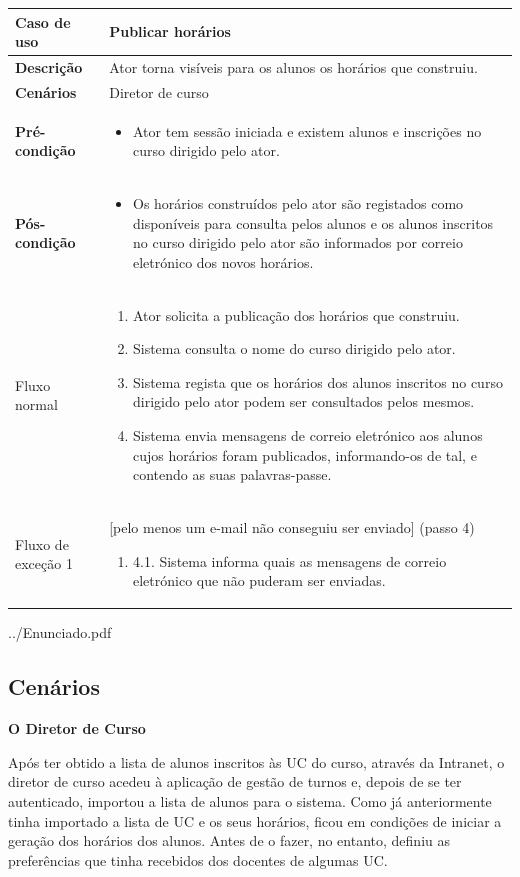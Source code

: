 \documentclass[12pt, a4paper]{article}
\makeatletter
\renewcommand\section[1]{
    \newpage
    \thispagestyle{empty}
    \vspace*{\fill}
    \@startsection{section}{1}{\z@}{0px}{50px}{\normalfont\Huge\bfseries}{#1}
    \vspace*{\fill}
    \newpage
}
\newenvironment{condition}{
    \begin{itemize}[wide=0pt]
        \vspace{-0.2cm}
}{
        \vspace{-0.5cm}
    \end{itemize}
}
\newcommand\flow[1]{
    Fluxo normal &
    \singlespacing
    \begin{enumerate}[wide=0pt]
        #1
        \vspace{-0.3cm}
    \end{enumerate} \\ \hline
}
\newcommand\otherflow[3]{
    #1 &
    #2
    \singlespacing
    \begin{enumerate}[wide=0pt]
        #3
        \vspace{-0.3cm}
    \end{enumerate} \\ \hline
}
\newenvironment{usecase}[5]{
    \begin{table}[H]
        \centering
        \begin{tabular}{|>{\centering\arraybackslash\bf}m{3cm}|m{13cm}|}
            \hline
            Caso de uso & \textbf{#1} \\

            \hline
            Descrição & #2 \\

            \hline
            Cenários & #3 \\

            \hline
            Pré-condição &
            \begin{condition}
                #4
            \end{condition} \\

            \hline
            Pós-condição &
            \begin{condition}
                #5
            \end{condition} \\

            \hline
}{
    \end{tabular}
\end{table}
}
\makeatother
\begin{document}
\begin{usecase}
    {Publicar horários}
    {Ator torna visíveis para os alunos os horários que construiu.}
    {Diretor de curso}
    {\item Ator tem sessão iniciada e existem alunos e inscrições no curso dirigido pelo ator.}
    {
        \item Os horários construídos pelo ator são registados como disponíveis para consulta pelos
            alunos e os alunos inscritos no curso dirigido pelo ator são informados por correio
            eletrónico dos novos horários.
    }

    \flow{
        \item Ator solicita a publicação dos horários que construiu.
        \item Sistema consulta o nome do curso dirigido pelo ator.
        \item Sistema regista que os horários dos alunos inscritos no curso dirigido pelo ator podem
            ser consultados pelos mesmos.
        \item Sistema envia mensagens de correio eletrónico aos alunos cujos horários foram
            publicados, informando-os de tal, e contendo as suas palavras-passe.
    }

    \otherflow{Fluxo de exceção 1}{[pelo menos um e-mail não conseguiu ser enviado] (passo 4)}{
        \item[4.1.] Sistema informa quais as mensagens de correio eletrónico que não puderam ser
            enviadas.
    }
\end{usecase}


\section{Anexos}


    {../Enunciado.pdf}


\subsection{Cenários}
\label{use-cases}

\textbf{O Diretor de Curso}

Após ter obtido a lista de alunos inscritos às UC do curso, através da Intranet, o diretor de curso
acedeu à aplicação de gestão de turnos e, depois de se ter autenticado, importou a lista de alunos
para o sistema. Como já anteriormente tinha importado a lista de UC e os seus horários, ficou em
condições de iniciar a geração dos horários dos alunos. Antes de o fazer, no entanto, definiu as
preferências que tinha recebidos dos docentes de algumas UC.
\end{document}
